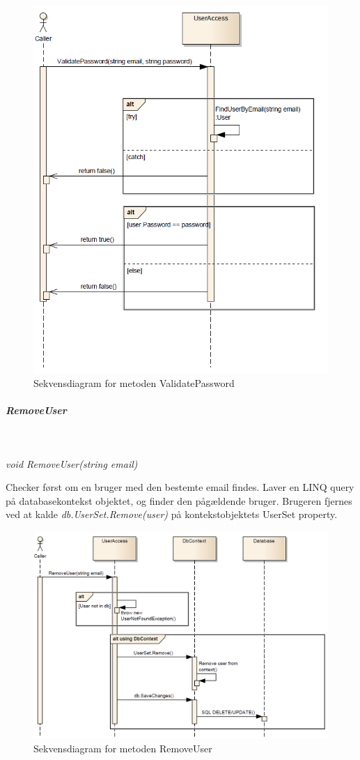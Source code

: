 \begin{figure}[h]
\centering
\includegraphics[width=0.7\linewidth]{figs/dbSeq/validatePassword.PNG}
\caption{Sekvensdiagram for metoden ValidatePassword}
\label{fig:validatePassword}
\end{figure}


\subparagraph{RemoveUser}\

\textit{void RemoveUser(string email)}

Checker først om en bruger med den bestemte email findes.
Laver en LINQ query på databasekontekst objektet, og finder den pågældende bruger.
Brugeren fjernes ved at kalde \textit{db.UserSet.Remove(user)} på kontekstobjektets UserSet property.

\begin{figure}[h]
\centering
\includegraphics[width=\linewidth]{figs/dbSeq/removeUser.PNG}
\caption{Sekvensdiagram for metoden RemoveUser}
\label{fig:removeUser}
\end{figure}


